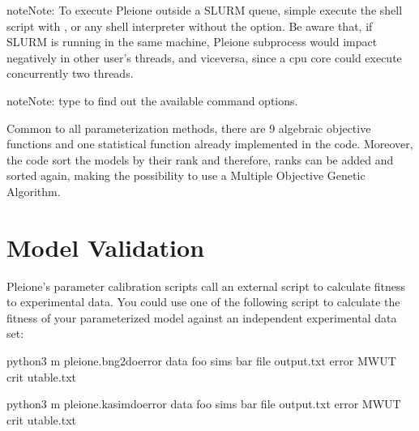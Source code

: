 \documentclass[letterpaper,10pt,english]{sphinxmanual}
\begin{document}
\begin{sphinxadmonition}{note}{Note:}
 To execute Pleione outside a SLURM
queue, simple execute the shell script with ,  or any shell
interpreter without the  option. Be aware that, if SLURM is
running in the same machine, Pleione subprocess would impact negatively in
other user’s threads, and viceversa, since a cpu core could execute
concurrently two threads.
\end{sphinxadmonition}

\begin{sphinxadmonition}{note}{Note:}
 type  to find out the
available command options.
\end{sphinxadmonition}

Common to all parameterization methods, there are 9 algebraic objective
functions and one statistical function already implemented in the code.
Moreover, the code sort the models by their rank and therefore, ranks can be
added and sorted again, making the possibility to use a Multiple Objective
Genetic Algorithm.


\section{Model Validation}
\label{\detokenize{Validation:model-validation}}\label{\detokenize{Validation::doc}}
Pleione’s parameter calibration scripts call an external script to calculate
fitness to experimental data. You could use one of the following script to
calculate the fitness of your parameterized model against an independent
experimental data set:

%
\begin{sphinxVerbatim}[commandchars=\\\{\}]
python3 \PYGZhy{}m pleione.bng2\PYGZhy{}doerror \PYGZhy{}\PYGZhy{}data foo \PYGZhy{}\PYGZhy{}sims bar 
\PYGZhy{}\PYGZhy{}file output.txt \PYGZhy{}\PYGZhy{}error MWUT \PYGZhy{}\PYGZhy{}crit utable.txt
\end{sphinxVerbatim}


%
\begin{sphinxVerbatim}[commandchars=\\\{\}]
python3 \PYGZhy{}m pleione.kasim\PYGZhy{}doerror \PYGZhy{}\PYGZhy{}data foo \PYGZhy{}\PYGZhy{}sims bar 
\PYGZhy{}\PYGZhy{}file output.txt \PYGZhy{}\PYGZhy{}error MWUT \PYGZhy{}\PYGZhy{}crit utable.txt
\end{sphinxVerbatim}
\end{document}
